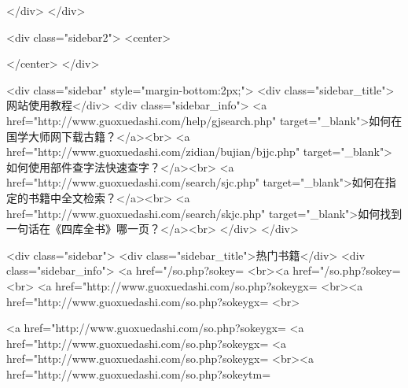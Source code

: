 </div>
</div>


<div class="sidebar2">
<center>


</center>
</div>

<div class="sidebar"  style="margin-bottom:2px;">
<div class="sidebar_title">网站使用教程</div>
<div class="sidebar_info">
<a href="http://www.guoxuedashi.com/help/gjsearch.php" target="_blank">如何在国学大师网下载古籍？</a><br>
<a href="http://www.guoxuedashi.com/zidian/bujian/bjjc.php" target="_blank">如何使用部件查字法快速查字？</a><br>
<a href="http://www.guoxuedashi.com/search/sjc.php" target="_blank">如何在指定的书籍中全文检索？</a><br>
<a href="http://www.guoxuedashi.com/search/skjc.php" target="_blank">如何找到一句话在《四库全书》哪一页？</a><br>
</div>
</div>


<div class="sidebar">
<div class="sidebar_title">热门书籍</div>
<div class="sidebar_info">
<a href="/so.php?sokey=%
<br><a href="/so.php?sokey=%
<br>
<a href="http://www.guoxuedashi.com/so.php?sokeygx=%
<br><a href="http://www.guoxuedashi.com/so.php?sokeygx=%
<br>

<a href="http://www.guoxuedashi.com/so.php?sokeygx=%
<a href="http://www.guoxuedashi.com/so.php?sokeygx=%
<a href="http://www.guoxuedashi.com/so.php?sokeygx=%
<br><a href="http://www.guoxuedashi.com/so.php?sokeytm=%

